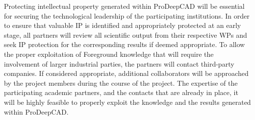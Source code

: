 Protecting intellectual property generated within ProDeepCAD will be essential for securing the technological leadership of the participating institutions.
In order to ensure that valuable IP is identified and appropriately protected at an early stage, all partners will review all scientific output from their respective WPs and seek IP protection for the corresponding results if deemed appropriate.
To allow the proper exploitation of Foreground knowledge that will require the involvement of larger industrial parties, the partners will contact third-party companies.
If considered appropriate, additional collaborators will be approached by the project members during the course of the project.
The expertise of the participating academic partners, and the contacts that are already in place, it will be highly feasible to properly exploit the knowledge and the results generated within ProDeepCAD.